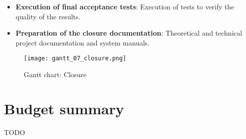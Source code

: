 \begin{itemize}
    \item \textbf{Execution of final acceptance tests}: Execution of tests to verify the quality of the results.
    \item \textbf{Preparation of the closure documentation}: Theoretical and technical project documentation and system manuals.
\end{itemize}

\begin{figure}[H]
    \caption{Gantt chart: Closure}
  \centering
  \texttt{[image: gantt\_07\_closure.png]}
\end{figure}



\section{Budget summary}

TODO


